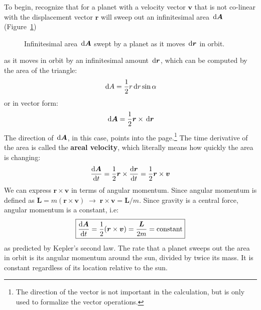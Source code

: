 To begin, recognize that for a planet with a velocity vector $\bm v$ that is
not co-linear with the displacement vector $\bm r$ will sweep out an
infinitesimal area $\dl{\bm A}$ (Figure~\ref{fig:dA})
\begin{figure}[ht]
  \centering
  \caption{Infinitesimal area $\dl{\bm A}$ swept by a planet as it moves
    $\dl{\bm r}$ in orbit.}
  \label{fig:dA}
\end{figure}
as it moves in orbit by an infinitesimal amount $\dl{\bm r}$, which can be
computed by the area of the triangle:
\begin{equation}
  \dl A=\frac12r\dl r\sin\alpha
\end{equation}
or in vector form:
\begin{equation}
  \dl{\bm A}=\frac12\bm r\times\dl{\bm r}
\end{equation}
The direction of $\dl{\bm A}$, in this case, points into the page.\footnote{The
  direction of the vector is not important in the calculation, but is only used
  to formalize the vector operations.} The time derivative of the area is
called the \textbf{areal velocity}, which literally means how quickly the area
is changing:
\begin{equation}
  \diff{\bm A}t
  =\frac12\bm r\times\diff{\bm r}t
  =\frac12\bm r\times\bm v
\end{equation}
We can express $\bm r\times\bm v$ in terms of angular momentum. Since
angular momentum is defined as $\bm L=m(\bm r\times\bm v)\;\to\;
\bm r\times\bm v=\bm L/m$. Since gravity is a central force, angular
momentum is a constant, i.e:
\begin{equation}
  \boxed{\diff{\bm A}t=\frac12(\bm r\times\bm v)=\frac{\bm L}{2m}=
    \text{constant}
  }
  \label{constant}
\end{equation}
as predicted by Kepler's second law. The rate that a planet sweeps out the area
in orbit is its angular momentum around the sun, divided by twice its mass. It
is constant regardless of its location relative to the sun.




